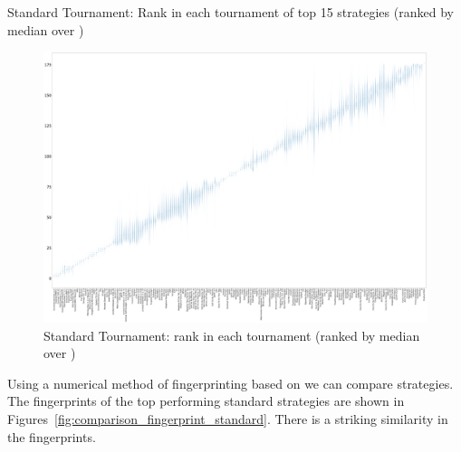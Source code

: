 \documentclass{article}
\begin{document}
\begin{table}[!hbtp]
    \centering
        
        \caption{Standard Tournament: Rank in each tournament
        of top 15 strategies (ranked by median over
        \protecttournaments)}
        \label{tbl:standard_ranks}
\end{table}

\begin{landscape}
    \begin{figure}[!hbtp]
        \centering
        \includegraphics[width=\paperwidth]{./assets/standard_ranks_boxplots.pdf}
        \caption{Standard Tournament: rank in each tournament (ranked by
        median over
        \protecttournaments)}
        \label{fig:standard_ranks_boxplot}
    \end{figure}
\end{landscape}


Using a numerical method of fingerprinting based on
\cite{Ashlock2008, ashlock2009fingerprint} we can compare
strategies. The fingerprints of the top performing standard strategies are shown
in Figures~\ref{fig:comparison_fingerprint_standard}. There is a striking
similarity in the fingerprints.
\end{document}
